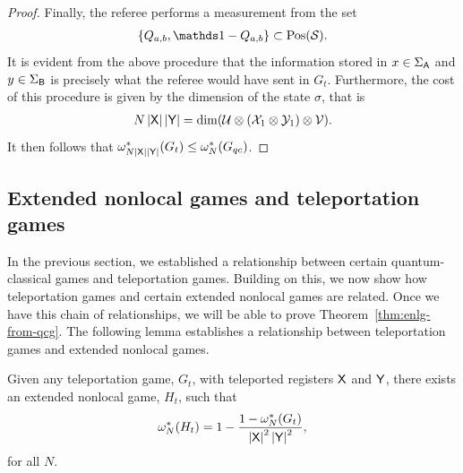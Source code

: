 \begin{proof}
Finally, the referee performs a measurement from the set 
\begin{align}
	\{ Q_{a,b}, \I - Q_{a,b} \} \subset \Pos(\S).
\end{align}
It is evident from the above procedure that the information stored in $x \in \Sigma_{\mathsf{A}}$ and $y \in \Sigma_{\mathsf{B}}$ is precisely what the referee would have sent in $G_t$. Furthermore, the cost of this procedure is given by the dimension of the state $\sigma$, that is
\begin{align}
	N \left\lvert \mathsf{X} \right\rvert \left\lvert \mathsf{Y} \right\rvert = \dim(\mathcal{U} \otimes (\mathcal{X}_1 \otimes \mathcal{Y}_1) \otimes \mathcal{V}).
\end{align}
It then follows that $\omega_{N\left\lvert \mathsf{X} \right\rvert\left\lvert \mathsf{Y} \right\rvert}^*(G_t) \leq \omega_N^*(G_{qc})$.
\end{proof}

\subsection{Extended nonlocal games and teleportation games} \label{sec:extended-nonlocal-games-and-teleportation-games}

In the previous section, we established a relationship between certain quantum-classical games and teleportation games. Building on this, we now show how teleportation games and certain extended nonlocal games are related. Once we have this chain of relationships, we will be able to prove Theorem~\ref{thm:enlg-from-qcg}. The following lemma establishes a relationship between teleportation games and extended nonlocal games. 

\begin{lemma} \label{lem:telep-to-enlg}
	Given any teleportation game, $G_t$, with teleported registers $\mathsf{X}$ and $\mathsf{Y}$, there exists an extended nonlocal game, $H_t$, such that 
	\begin{align}
		\omega_N^*(H_t) = 1 - \frac{ 1 - \omega_{N}^*(G_t)  }{ \left\lvert \mathsf{X} \right\rvert^2 \left\lvert \mathsf{Y} \right\rvert^2 },
	\end{align}
	for all $N$.
\end{lemma}

